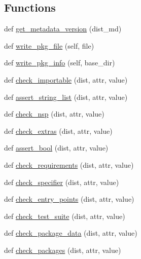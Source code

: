 \subsection*{Functions}
\begin{DoxyCompactItemize}
\item 
def \hyperlink{namespacesetuptools_1_1dist_a6b2c2fcf3e6b5aa5c8434b64c92f23b6}{get\+\_\+metadata\+\_\+version} (dist\+\_\+md)
\item 
def \hyperlink{namespacesetuptools_1_1dist_a37d5624a94cb0491805ecd6dddba85bc}{write\+\_\+pkg\+\_\+file} (self, file)
\item 
def \hyperlink{namespacesetuptools_1_1dist_a7e266b8822f0a0702b118544cc667552}{write\+\_\+pkg\+\_\+info} (self, base\+\_\+dir)
\item 
def \hyperlink{namespacesetuptools_1_1dist_a34c7bc2fb87e3610638e5e71cbbebb9c}{check\+\_\+importable} (dist, attr, value)
\item 
def \hyperlink{namespacesetuptools_1_1dist_adef1021a792040663598a45748f8cf95}{assert\+\_\+string\+\_\+list} (dist, attr, value)
\item 
def \hyperlink{namespacesetuptools_1_1dist_a328a9faed0ff4a67c79bf755bb8aa9c5}{check\+\_\+nsp} (dist, attr, value)
\item 
def \hyperlink{namespacesetuptools_1_1dist_a67dcebb09dd6485db2f8850dfe3045f3}{check\+\_\+extras} (dist, attr, value)
\item 
def \hyperlink{namespacesetuptools_1_1dist_a6248cc8e03decc97c768ba201e3a3244}{assert\+\_\+bool} (dist, attr, value)
\item 
def \hyperlink{namespacesetuptools_1_1dist_a29a45dac0119a4bfaf9412a216a6fd41}{check\+\_\+requirements} (dist, attr, value)
\item 
def \hyperlink{namespacesetuptools_1_1dist_ad16e6b95535ea80403747b5ef21cd66d}{check\+\_\+specifier} (dist, attr, value)
\item 
def \hyperlink{namespacesetuptools_1_1dist_a392bacff0b7eefe57d55ac19706234c1}{check\+\_\+entry\+\_\+points} (dist, attr, value)
\item 
def \hyperlink{namespacesetuptools_1_1dist_a6a197d513c80b32120484d6c7dd29066}{check\+\_\+test\+\_\+suite} (dist, attr, value)
\item 
def \hyperlink{namespacesetuptools_1_1dist_a1c396158f859904995bff0393651fe59}{check\+\_\+package\+\_\+data} (dist, attr, value)
\item 
def \hyperlink{namespacesetuptools_1_1dist_ae1e38f1e592688eba2adffd9498dba7b}{check\+\_\+packages} (dist, attr, value)
\end{DoxyCompactItemize}
